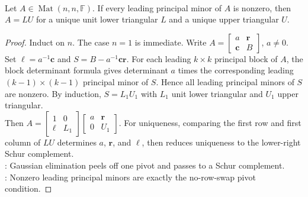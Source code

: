 \begin{theorem} \label{thm:lu-factorization-leading-principal-minors} \\
Let $A\in\operatorname{Mat}(n,n,\mathbb{F})$. If every leading principal minor of $A$ is nonzero, then $A=LU$ for a unique unit lower triangular $L$ and a unique upper triangular $U$.
\begin{proof}
Induct on $n$. The case $n=1$ is immediate. Write $A=
\begin{bmatrix}
a & \mathbf{r}\\
\mathbf{c} & B
\end{bmatrix}$, $a\neq0$.\\
Set $\boldsymbol{\ell}=a^{-1}\mathbf{c}$ and $S=B-a^{-1}\mathbf{c}\mathbf{r}$. For each leading $k\times k$ principal block of $A$, the block determinant formula gives determinant $a$ times the corresponding leading $(k-1)\times(k-1)$ principal minor of $S$. Hence all leading principal minors of $S$ are nonzero. By induction, $S=L_1U_1$ with $L_1$ unit lower triangular and $U_1$ upper triangular.\\
Then $A=
\begin{bmatrix}
1 & 0\\
\boldsymbol{\ell} & L_1
\end{bmatrix}
\begin{bmatrix}
a & \mathbf{r}\\
0 & U_1
\end{bmatrix}$. For uniqueness, comparing the first row and first column of $LU$ determines $a$, $\mathbf{r}$, and $\boldsymbol{\ell}$, then reduces uniqueness to the lower-right Schur complement.\\
: Gaussian elimination peels off one pivot and passes to a Schur complement.\\
: Nonzero leading principal minors are exactly the no-row-swap pivot condition.
\end{proof}
\end{theorem}

